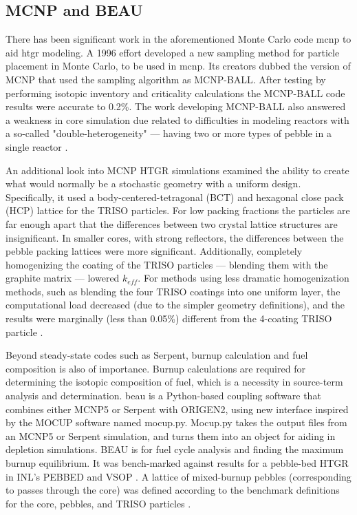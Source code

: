 \subsection{MCNP and BEAU}
\label{sec:mcnp-beau}

There has been significant work in the aforementioned Monte Carlo code \acrshort{mcnp} to aid \acrshort{htgr} modeling.  A 1996 effort developed a new sampling method for particle placement in Monte Carlo, to be used in \acrshort{mcnp}.  Its creators dubbed the version of MCNP that used the sampling algorithm as MCNP-BALL.  After testing by performing isotopic inventory and criticality calculations the MCNP-BALL code results were accurate to 0.2\%.  The work developing MCNP-BALL also answered a weakness in core simulation due related to difficulties in modeling reactors with a so-called "double-heterogeneity" --- having two or more types of pebble in a single reactor \cite{murata_new_1997}.

An additional look into MCNP HTGR simulations examined the ability to create what would normally be a stochastic geometry with a uniform design.  Specifically, it used a body-centered-tetragonal (BCT) and hexagonal close pack (HCP) lattice for the TRISO particles.  For low packing fractions the particles are far enough apart that the differences between two crystal lattice structures are insignificant.  In smaller cores, with strong reflectors, the differences between the pebble packing lattices were more significant.  Additionally, completely homogenizing the coating of the TRISO particles --- blending them with the graphite matrix --- lowered $k_{eff}$.  For methods using less dramatic homogenization methods, such as blending the four TRISO coatings into one uniform layer, the computational load decreased (due to the simpler geometry definitions), and the results were marginally (less than 0.05\%) different from the 4-coating TRISO particle \cite{karriem_mcnp_2001}.

Beyond steady-state codes such as Serpent, burnup calculation and fuel composition is also of importance.  Burnup calculations are required for determining the isotopic composition of fuel, which is a necessity in source-term analysis and determination. \acrfull{beau} is a Python-based coupling software that combines either MCNP5 or Serpent with ORIGEN2, using new interface inspired by the MOCUP software named mocup.py.  Mocup.py takes the output files from an MCNP5 or Serpent simulation, and turns them into an object for aiding in depletion simulations.  BEAU is for fuel cycle analysis and finding the maximum burnup equilibrium.  It was bench-marked against results for a pebble-bed HTGR in INL's PEBBED and VSOP \cite{cisneros_pebble_2013}.  A lattice of mixed-burnup pebbles (corresponding to passes through the core) was defined according to the benchmark definitions for the core, pebbles, and TRISO particles \cite{cisneros_pebble_2013}.


